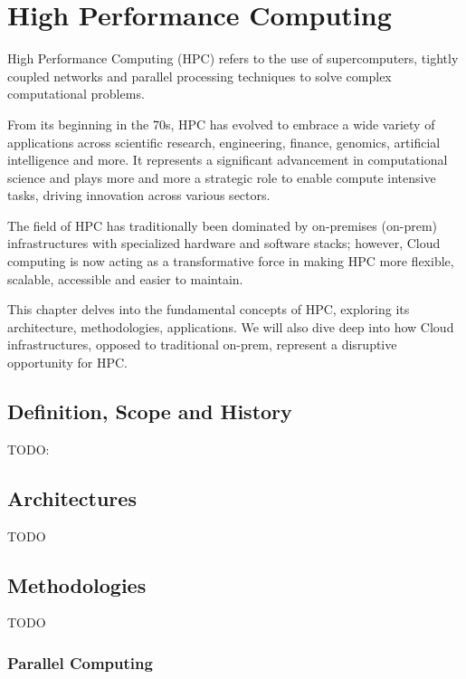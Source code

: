 

\chapter{High Performance Computing}

High Performance Computing (HPC) refers to the use of supercomputers, tightly coupled networks and parallel processing techniques to solve complex computational problems.

From its beginning in the 70s, HPC has evolved to embrace a wide variety of applications across scientific research, engineering, finance, genomics, artificial intelligence and more. 
It represents a significant advancement in computational science and plays more and more a strategic role to enable compute intensive tasks, driving innovation across various sectors. 

The field of HPC has traditionally been dominated by on-premises (on-prem) infrastructures with specialized hardware and software stacks; however, Cloud computing is now acting as a transformative force in making HPC more flexible, scalable, accessible and easier to maintain.

This chapter delves into the fundamental concepts of HPC, exploring its architecture, methodologies, applications. We will also dive deep into how Cloud infrastructures, opposed to traditional on-prem, represent a disruptive opportunity for HPC.

\section{Definition, Scope and History}

TODO: \cite{MythsLegendsHpc2023}

\section{Architectures}

TODO

\section{Methodologies}

TODO

\subsection{Parallel Computing}

